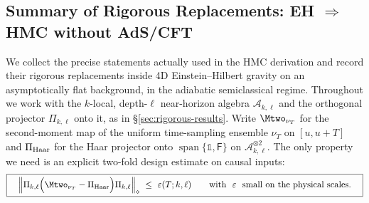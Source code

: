 \documentclass[11pt,a4paper]{article}
\providecommand{\texorpdfstring}[2]{#1}
\theoremstyle{plain}
\theoremstyle{definition}
\theoremstyle{remark}
\begin{document}
\subsection{Summary of Rigorous Replacements: EH \texorpdfstring{$\Rightarrow$}{=>} HMC without AdS/CFT}\label{sec:eh-to-hmc-summary}
We collect the precise statements actually used in the HMC derivation and record their rigorous replacements inside 4D Einstein--Hilbert gravity on an asymptotically flat background, in the adiabatic semiclassical regime.
Throughout we work with the $k$-local, depth-$\ell$ near-horizon algebra $\mathscr{A}_{k,\ell}$ and the orthogonal projector $\Pi_{k,\ell}$ onto it, as in \S\ref{sec:rigorous-results}. Write $\Mtwo_{\nu_T}$ for the second-moment map of the uniform time-sampling ensemble $\nu_T$ on $[u,u+T]$ and $\Pi_{\rm Haar}$ for the Haar projector onto $\operatorname{span}\{\mathbb{1},\mathsf{F}\}$ on $\mathscr{A}_{k,\ell}^{\otimes 2}$.
The only property we need is an explicit two-fold design estimate on causal inputs:
\begin{equation}
\label{eq:twirl-design-bound}
\boxed{\quad
\left\|
\Pi_{k,\ell}\Big(\Mtwo_{\nu_T}-\Pi_{\rm Haar}\Big)\Pi_{k,\ell}
\right\|_{\diamond}\ \le\ \varepsilon(T;k,\ell)\qquad\text{with $\ \varepsilon\ $ small on the physical scales.}\quad}
\end{equation}
\end{document}
